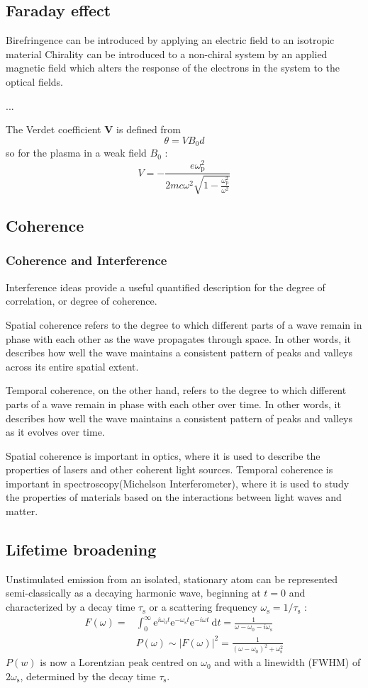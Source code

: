\documentclass[12pt,a4paper]{article}
\begin{document}
\subsection{Faraday effect}
Birefringence can be introduced by applying an electric field to an isotropic material
Chirality can be introduced to a non-chiral system by an applied magnetic field which alters the response of the electrons in the system to the optical fields.

...

The Verdet coefficient $\boldsymbol{V}$ is defined from
$$
\theta=V B_0 d
$$
so for the plasma in a weak field $B_0$ :
$$
V=-\frac{e \omega_{\mathrm{p}}^2}{2 m c \omega^2 \sqrt{1-\frac{\omega_{\mathrm{p}}^2}{\omega^2}}}
$$
\subsection{Coherence}
\subsubsection{Coherence and Interference}
Interference ideas provide a useful quantified description for the degree of correlation, or degree of coherence.

Spatial coherence refers to the degree to which different parts of a wave remain in phase with each other as the wave propagates through space. In other words, it describes how well the wave maintains a consistent pattern of peaks and valleys across its entire spatial extent. 

Temporal coherence, on the other hand, refers to the degree to which different parts of a wave remain in phase with each other over time. In other words, it describes how well the wave maintains a consistent pattern of peaks and valleys as it evolves over time.

Spatial coherence is important in optics, where it is used to describe the properties of lasers and other coherent light sources. Temporal coherence is important in spectroscopy(Michelson Interferometer), where it is used to study the properties of materials based on the interactions between light waves and matter.

\subsection{Lifetime broadening} Unstimulated emission from an isolated, stationary atom can be represented semi-classically as a decaying harmonic wave, beginning at $t=0$ and characterized by a decay time $\tau_{\mathrm{s}}$ or a scattering frequency $\omega_{\mathrm{s}}=1 / \tau_{\mathrm{s}}$ :
$$
\begin{aligned}
F(\omega)= & \int_0^{\infty} \mathrm{e}^{i \omega_0 t} \mathrm{e}^{-\omega_{\mathrm{s}} t} \mathrm{e}^{-i \omega t} \mathrm{~d} t=\frac{1}{\omega-\omega_0-i \omega_{\mathrm{s}}} \\
& P(\omega) \sim|F(\omega)|^2=\frac{1}{\left(\omega-\omega_0\right)^2+\omega_{\mathrm{s}}^2}
\end{aligned}
$$
$P(w)$ is now a Lorentzian peak centred on $\omega_0$ and with a linewidth (FWHM) of $2 \omega_{\mathrm{s}}$, determined by the decay time $\tau_{\mathrm{s}}$.
\end{document}
